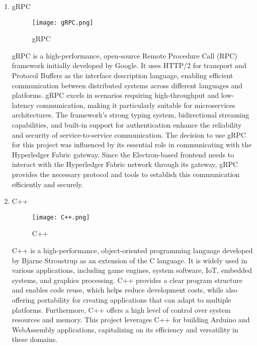 \documentclass[conference]{IEEEtran}
\begin{document}
\begin{enumerate}[itemsep=2ex, parsep=1ex]
	\item gRPC
	      	      	      
	      \begin{figure}[h!]
	      	\centering
	      	\texttt{[image: gRPC.png]}
	      	\caption{gRPC}
	      	\label{fig:gRPC}
	      \end{figure}
	      	      	      
	      gRPC is a high-performance, open-source Remote Procedure Call (RPC) framework
	      initially developed by Google. It uses HTTP/2 for transport and Protocol
	      Buffers as the interface description language, enabling efficient communication
	      between distributed systems across different languages and platforms. gRPC
	      excels in scenarios requiring high-throughput and low-latency
	      communication, making it particularly suitable for microservices architectures.
	      The framework's strong typing system, bidirectional streaming capabilities,
	      and built-in support for authentication enhance the reliability and
	      security of service-to-service communication. The decision to use gRPC for
	      this project was influenced by its essential role in communicating with the
	      Hyperledger Fabric gateway. Since the Electron-based frontend needs to
	      interact with the Hyperledger Fabric network through its gateway, gRPC provides
	      the necessary protocol and tools to establish this communication efficiently
	      and securely.
	      	      
	      \vspace{5cm}
	      	                 
	\item C++
	      	      	      
	      \begin{figure}[h!]
	      	\centering
	      	\texttt{[image: C++.png]}
	      	\caption{C++}
	      	\label{fig:C++}
	      \end{figure}
	      	      	      
	      C++ is a high-performance, object-oriented programming language developed by
	      Bjarne Stroustrup as an extension of the C language. It is widely used in
	      various applications, including game engines, system software, IoT,
	      embedded systems, and graphics processing. C++ provides a clear program
	      structure and enables code reuse, which helps reduce development costs,
	      while also offering portability for creating applications that can adapt
	      to multiple platforms. Furthermore, C++ offers a high level of control
	      over system resources and memory. This project leverages C++ for building Arduino
	      and WebAssembly applications, capitalizing on its efficiency and
	      versatility in these domains.
	      	      	      

\end{enumerate}
\end{document}
